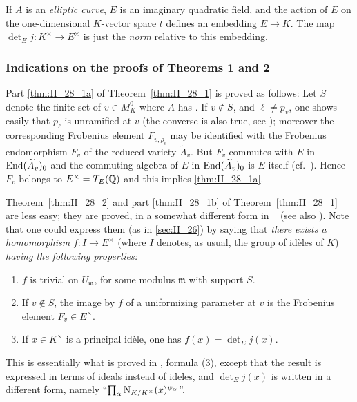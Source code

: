 \begin{ex}
If $A$ is an \emph{elliptic curve}, $E$ is an imaginary quadratic field, and
the action of $E$ on the one-dimensional $K$-vector space $t$ defines an
embedding $E \to K$. The map $\det_E j\colon K^\times \to E^\times$ is just the
\emph{norm} relative to this embedding.
\end{ex}

\subsubsection*{Indications on the proofs of Theorems 1 and 2}
Part \ref{thm:II_28_1a} of Theorem~\ref{thm:II_28_1} is proved as follows: Let
$S$ denote the finite set of $v \in M_K^0$ where $A$ has . If $v \notin S$, and
\dpage
$\ell \ne p_v$, one shows easily that $p_\ell$ is unramified at $v$ (the
converse is also true, see \cite{32}); moreover the corresponding Frobenius
element $F_{v, \rho_\ell}$ may be identified with the Frobenius endomorphism
$F_v$ of the reduced variety $\widetilde{A}_v$. But $F_v$ commutes with $E$ in
$\operatorname{End}(\widetilde{A}_v)_0$ and the commuting algebra of $E$ in
$\operatorname{End}(\widetilde{A}_v)_0$ is $E$ itself (cf.\ \cite[39]{34}). Hence $F_v$
belongs to $E^\times = T_E(\mathbb{Q})$ and this implies \ref{thm:II_28_1a}.

Theorem~\ref{thm:II_28_2} and part \ref{thm:II_28_1b} of
Theorem~\ref{thm:II_28_1} are less easy; they are proved, in a somewhat
different form in \citeauthor{34}~\cite{34} (see also \cite{32}). Note that one
could express them (as in \ref{sec:II_26}) by saying that \emph{there exists a
homomorphism} $f\colon I \to E^\times$ (where $I$ denotes, as usual, the group
of idèles of $K$) \emph{having the following properties:}
\begin{enumerate}
\item $f$ is trivial on $U_{\mathfrak{m}}$, for some modulus $\mathfrak{m}$
	with support $S$.
\item If $v \notin S$, the image by $f$ of a uniformizing parameter at
	$v$ is the Frobenius element $F_v \in E^\times$.
\item If $x \in K^\times$ is a principal idèle, one has $f(x) = \det_E j(x)$.
\end{enumerate}
This is essentially what is proved in \cite[148]{34}, formula (3),
except that the result is expressed in terms of ideals instead of
ideles, and $\det_E j(x)$ is written in a different form, namely
``$ \prod_{\alpha} \operatorname{N}_{K/K^\times}(x)^{\psi_\alpha} $''.


